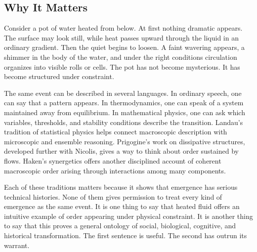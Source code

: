 \documentclass[11pt,a4paper,openany]{book}
\begin{document}
\subsection{Why It Matters}
Consider a pot of water heated from below. At first nothing dramatic appears. The surface may look still, while heat passes upward through the liquid in an ordinary gradient. Then the quiet begins to loosen. A faint wavering appears, a shimmer in the body of the water, and under the right conditions circulation organizes into visible rolls or cells. The pot has not become mysterious. It has become structured under constraint. \cite{landau_stat_physics,prigogine_dissipative}\par
The same event can be described in several languages. In ordinary speech, one can say that a pattern appears. In thermodynamics, one can speak of a system maintained away from equilibrium. In mathematical physics, one can ask which variables, thresholds, and stability conditions describe the transition. Landau's tradition of statistical physics helps connect macroscopic description with microscopic and ensemble reasoning. Prigogine's work on dissipative structures, developed further with Nicolis, gives a way to think about order sustained by flows. Haken's synergetics offers another disciplined account of coherent macroscopic order arising through interactions among many components.\par
Each of these traditions matters because it shows that emergence has serious technical histories. None of them gives permission to treat every kind of emergence as the same event. It is one thing to say that heated fluid offers an intuitive example of order appearing under physical constraint. It is another thing to say that this proves a general ontology of social, biological, cognitive, and historical transformation. The first sentence is useful. The second has outrun its warrant.\par
\end{document}
